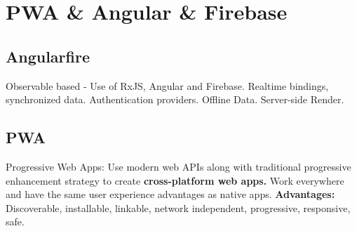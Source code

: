 
\section{PWA \& Angular \& Firebase}
\subsection{Angularfire}
Observable based - Use of RxJS, Angular and Firebase.
Realtime bindings, synchronized data.
Authentication providers.
Offline Data.
Server-side Render.

\subsection{PWA}
Progressive Web Apps: Use modern web APIs along with traditional progressive enhancement strategy to create \textbf{cross-platform web apps.}
Work everywhere and have the same user experience advantages as native apps. \textbf{Advantages:} Discoverable, installable, linkable, network independent, progressive, responsive, safe.

